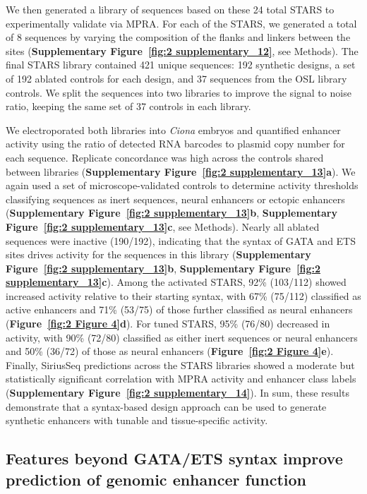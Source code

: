 We then generated a library of sequences based on these 24 total STARS to experimentally validate via MPRA. For each of the STARS, we generated a total of 8 sequences by varying the composition of the flanks and linkers between the sites (\textbf{Supplementary Figure~\ref{fig:2 supplementary_12}}, see Methods). The final STARS library contained 421 unique sequences: 192 synthetic designs, a set of 192 ablated controls for each design, and 37 sequences from the OSL library controls. We split the sequences into two libraries to improve the signal to noise ratio, keeping the same set of 37 controls in each library. 

We electroporated both libraries into \textit{Ciona} embryos and quantified enhancer activity using the ratio of detected RNA barcodes to plasmid copy number for each sequence. Replicate concordance was high across the controls shared between libraries (\textbf{Supplementary Figure~\ref{fig:2 supplementary_13}a}). We again used a set of microscope-validated controls to determine activity thresholds classifying sequences as inert sequences, neural enhancers or ectopic enhancers (\textbf{Supplementary Figure~\ref{fig:2 supplementary_13}b}, \textbf{Supplementary Figure~\ref{fig:2 supplementary_13}c}, see Methods). Nearly all ablated sequences were inactive (190/192), indicating that the syntax of GATA and ETS sites drives activity for the sequences in this library (\textbf{Supplementary Figure~\ref{fig:2 supplementary_13}b}, \textbf{Supplementary Figure~\ref{fig:2 supplementary_13}c}). Among the activated STARS, 92\% (103/112) showed increased activity relative to their starting syntax, with 67\% (75/112) classified as active enhancers and 71\% (53/75) of those further classified as neural enhancers (\textbf{Figure~\ref{fig:2 Figure 4}d}). For tuned STARS, 95\% (76/80) decreased in activity, with 90\% (72/80) classified as either inert sequences or neural enhancers and 50\% (36/72) of those as neural enhancers (\textbf{Figure~\ref{fig:2 Figure 4}e}). Finally, SiriusSeq predictions across the STARS libraries showed a moderate but statistically significant correlation with MPRA activity and enhancer class labels (\textbf{Supplementary Figure~\ref{fig:2 supplementary_14}}). In sum, these results demonstrate that a syntax-based design approach can be used to generate synthetic enhancers with tunable and tissue-specific activity.

\subsection{Features beyond GATA/ETS syntax improve prediction of genomic enhancer function}

